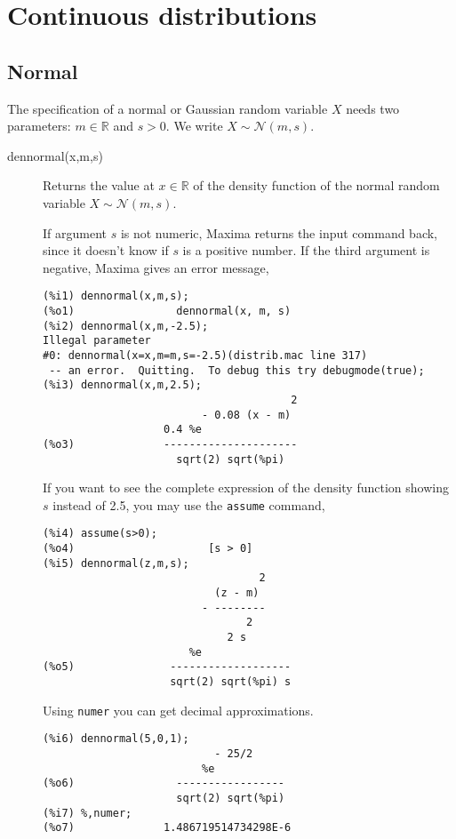 \documentclass[12pt,a4paper]{article}
\newcommand{\normal}{\mathcal{N}}
\newcommand{\R}{\mathbb{R}}
\begin{document}
\section{Continuous distributions}

\subsection{Normal}

The specification of a normal or Gaussian random variable $X$ needs two parameters: $m \in \R$ and $s > 0$. We write $X \sim \normal(m,s)$.

\begin{description}

\item[dennormal(x,m,s)] Returns the value at $x \in \R$ of the density function of the normal random variable $X \sim \normal(m,s)$.

If argument $s$ is not numeric, Maxima returns the input command back, since it doesn't know if $s$ is a positive number. If the third argument is negative, Maxima gives an error message,
\begin{verbatim}
(%i1) dennormal(x,m,s);
(%o1)                dennormal(x, m, s)
(%i2) dennormal(x,m,-2.5);
Illegal parameter
#0: dennormal(x=x,m=m,s=-2.5)(distrib.mac line 317)
 -- an error.  Quitting.  To debug this try debugmode(true);
(%i3) dennormal(x,m,2.5);
                                       2
                         - 0.08 (x - m)
                   0.4 %e
(%o3)              ---------------------
                     sqrt(2) sqrt(%pi)
\end{verbatim}

If you want to see the complete expression of the density function showing $s$ instead of 2.5, you may use the \verb|assume| command,
\begin{verbatim}
(%i4) assume(s>0);
(%o4)                     [s > 0]
(%i5) dennormal(z,m,s);
                                  2
                           (z - m)
                         - --------
                                2
                             2 s
                       %e
(%o5)               -------------------
                    sqrt(2) sqrt(%pi) s
\end{verbatim}

Using \verb|numer| you can get decimal approximations.
\begin{verbatim}
(%i6) dennormal(5,0,1);
                           - 25/2
                         %e
(%o6)                -----------------
                     sqrt(2) sqrt(%pi)
(%i7) %,numer;
(%o7)              1.486719514734298E-6
\end{verbatim}


\end{description}
\end{document}
